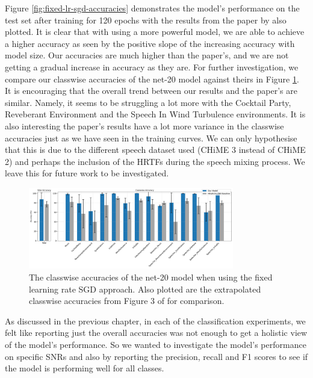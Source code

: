 \documentclass[logo,bsc,singlespacing,parskip,online]{infthesis}
\begin{document}
Figure \ref{fig:fixed-lr-sgd-accuracies} demonstrates the model's performance on the test set after training for 120 epochs 
with the results from the paper by \citet{Huwel2020HearDS} also plotted. It is clear 
that with using a more powerful model, we are able to achieve a higher accuracy 
as seen by the positive slope of the increasing accuracy with model size.
Our accuracies are much higher than the paper's, and we are not getting a gradual 
increase in accuracy as they are. For further investigation, we 
compare our classwise accuracies of the net-20 model against theirs in Figure 
\ref{fig:fixed-lr-sgd-classwise-accuracies}. It is encouraging 
that the overall trend between our results and the paper's are similar. 
Namely, it seems to be struggling a lot more with the Cocktail Party, Reveberant 
Environment and the Speech In Wind Turbulence environments.
It is also interesting the paper's results have a lot more variance in the classwise accuracies 
just as we have seen in the training curves. We can only hypothesise 
that this is due to the different speech dataset used (CHiME 3 instead of CHiME 2) 
and perhaps the inclusion of the HRTFs during the speech mixing process. We leave 
this for future work to be investigated.

\begin{figure}[h]
   \centering
   \includegraphics[width=0.8\textwidth]{net-20/FIXED-fixed-lr-sgd/classwise_accuracies.png}
   \caption{The classwise accuracies of the net-20 model when using the fixed learning rate SGD approach.
   Also plotted are the extrapolated classwise accuracies from Figure 3 of \citet{Huwel2020HearDS} for comparison.}
   \label{fig:fixed-lr-sgd-classwise-accuracies}
\end{figure}   

As discussed in the previous chapter, in each of the classification experiments, we felt like reporting just the overall 
accuracies was not enough to get a holistic view of the model's performance. 
So we wanted to investigate the model's performance on specific SNRs and also by reporting the precision, recall and F1 scores to
see if the model is performing well for all classes. 
\end{document}
